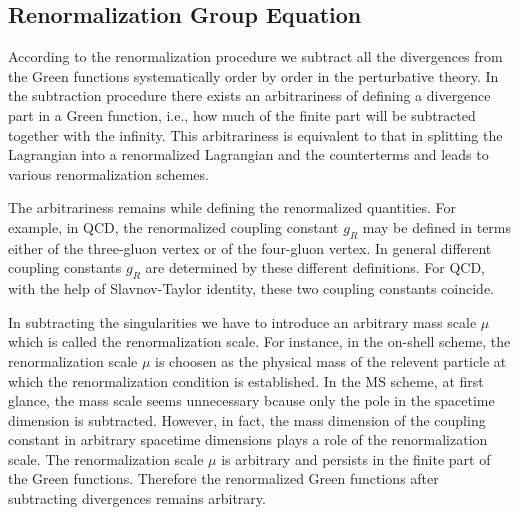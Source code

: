 \subsection{Renormalization Group Equation}
According to the renormalization procedure we subtract all the divergences from the Green functions systematically order by order in the perturbative theory. In the subtraction procedure there exists an arbitrariness of defining a divergence part in a Green function, i.e., how much of the finite part will be subtracted together with the infinity. This arbitrariness is equivalent to that in splitting the Lagrangian into a renormalized Lagrangian and the counterterms and leads to various renormalization schemes. 

The arbitrariness remains while defining the renormalized quantities. For example, in QCD, the renormalized coupling constant $g_R$ may be defined in terms either of the three-gluon vertex or of the four-gluon vertex. In general different coupling constants $g_R$ are determined by these different definitions. For QCD, with the help of Slavnov-Taylor identity, these two coupling constants coincide.

In subtracting the singularities we have to introduce an arbitrary mass scale $\mu$ which is called the renormalization scale. For instance, in the on-shell scheme, the renormalization scale $\mu$ is choosen as the physical mass of the relevent particle at which the renormalization condition is established. In the MS scheme, at first glance, the mass scale seems unnecessary bcause only the pole in the spacetime dimension is subtracted. However, in fact, the mass dimension of the coupling constant in arbitrary spacetime dimensions plays a role of the renormalization scale. The renormalization scale $\mu$ is arbitrary and persists in the finite part of the Green functions. Therefore the renormalized Green functions after subtracting divergences remains arbitrary.

